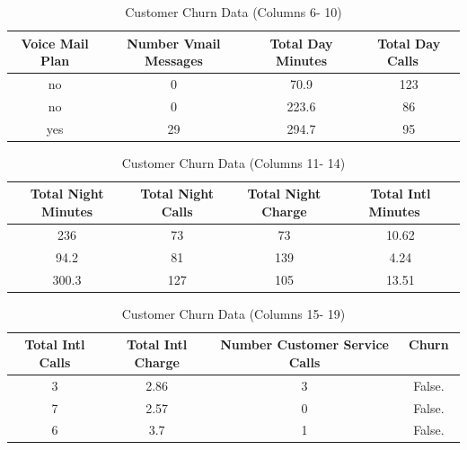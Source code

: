 \documentclass[a4paper,12pt]{report}
\begin{document}
\begin{table}[ht]
\caption{Customer Churn Data (Columns 6- 10)} %
\centering %
\begin{tabular}{c c c c } %
\hline %
Voice Mail Plan &  Number Vmail Messages  &  Total Day Minutes & Total Day Calls  \ \\ [0.5ex] %
\hline %
no & 0 & 70.9 & 123 \\ %
no & 0 & 223.6 & 86 \\
yes & 29 & 294.7 & 95\\ [1ex] %
\hline %
\end{tabular}
\label{table:nonlin} %
\end{table}

\begin{table}[ht]
\caption{Customer Churn Data (Columns 11- 14)} %
\centering %
\begin{tabular}{c c c c } %
\hline %
 Total Night Minutes &  Total Night Calls  &  Total Night Charge  & Total Intl Minutes \ \\ [0.5ex] %
\hline %
236 & 73 & 73 & 10.62 \\ %
94.2 & 81 & 139 & 4.24 \\
300.3 & 127 & 105 & 13.51\\ [1ex] %
\hline %
\end{tabular}
\label{table:nonlin} %
\end{table}

\begin{table}[ht]
\caption{Customer Churn Data (Columns 15- 19)} %
\centering %
\begin{tabular}{c c c c } %
\hline %
 Total Intl Calls  &  Total Intl Charge  &  Number Customer Service Calls & Churn \ \\ [0.5ex] %
\hline %
3 & 2.86 & 3 & False. \\ %
7 & 2.57 & 0 & False. \\
6 & 3.7 & 1 & False.\\ [1ex] %
\hline %
\end{tabular}
\label{table:nonlin} %
\end{table}
\end{document}
